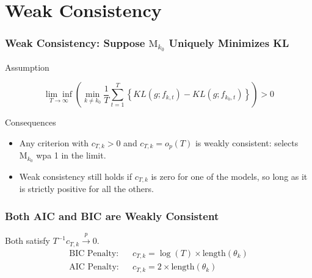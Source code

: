 \section{Weak Consistency}
\begin{frame}
  \frametitle{Weak Consistency: Suppose $\text{M}_{k_0}$ Uniquely Minimizes KL}
  
  \begin{block}{Assumption}

    \vspace{-1em}
	$$\underset{T\rightarrow \infty}{\lim\inf}\left(\underset{k \neq k_0}{\min} \frac{1}{T}\sum_{t = 1}^T \left\{ KL(g; f_{k,t}) - KL(g;f_{k_0,t}) \right\} \right) > 0$$
  \end{block}

  \pause

  \begin{block}{Consequences}
    \begin{itemize}
      \item Any criterion with $c_{T,k}> 0$ and $c_{T,k} = o_p(T)$ is weakly consistent: \alert{selects $\text{M}_{k_0}$ wpa 1 in the limit}. \pause
      \item Weak consistency still holds if $c_{T,k}$ is zero for one of the models, so long as it is strictly positive for all the others.
    \end{itemize}
  \end{block}

\end{frame}
\begin{frame}
  \frametitle{Both AIC and BIC are Weakly Consistent}
  
Both satisfy $T^{-1}c_{T,k} \overset{p}{\rightarrow} 0$.
	\begin{eqnarray*}
		\mbox{BIC Penalty:}&& c_{T,k} = \log(T) \times \mbox{length}(\theta_k)\\
		\mbox{AIC Penalty:} && c_{T,k} = 2\times \mbox{length}(\theta_k)
	\end{eqnarray*}
\end{frame}
